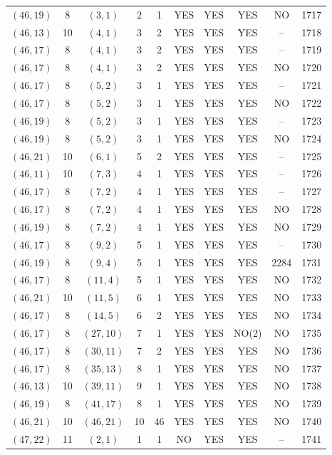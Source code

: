 \begin{longtable}{|c|c|c|c|c|c|c|c|c|c|}
$(46, 19)$ & 8 & $(3, 1)$ & 2 & 1 & YES & YES & YES & NO & 1717\\
$(46, 13)$ & 10 & $(4, 1)$ & 3 & 2 & YES & YES & YES & -- & 1718\\
$(46, 17)$ & 8 & $(4, 1)$ & 3 & 2 & YES & YES & YES & -- & 1719\\
$(46, 17)$ & 8 & $(4, 1)$ & 3 & 2 & YES & YES & YES & NO & 1720\\
$(46, 17)$ & 8 & $(5, 2)$ & 3 & 1 & YES & YES & YES & -- & 1721\\
$(46, 17)$ & 8 & $(5, 2)$ & 3 & 1 & YES & YES & YES & NO & 1722\\
$(46, 19)$ & 8 & $(5, 2)$ & 3 & 1 & YES & YES & YES & -- & 1723\\
$(46, 19)$ & 8 & $(5, 2)$ & 3 & 1 & YES & YES & YES & NO & 1724\\
$(46, 21)$ & 10 & $(6, 1)$ & 5 & 2 & YES & YES & YES & -- & 1725\\
$(46, 11)$ & 10 & $(7, 3)$ & 4 & 1 & YES & YES & YES & -- & 1726\\
$(46, 17)$ & 8 & $(7, 2)$ & 4 & 1 & YES & YES & YES & -- & 1727\\
$(46, 17)$ & 8 & $(7, 2)$ & 4 & 1 & YES & YES & YES & NO & 1728\\
$(46, 19)$ & 8 & $(7, 2)$ & 4 & 1 & YES & YES & YES & NO & 1729\\
$(46, 17)$ & 8 & $(9, 2)$ & 5 & 1 & YES & YES & YES & -- & 1730\\
$(46, 19)$ & 8 & $(9, 4)$ & 5 & 1 & YES & YES & YES & 2284 & 1731\\
$(46, 17)$ & 8 & $(11, 4)$ & 5 & 1 & YES & YES & YES & NO & 1732\\
$(46, 21)$ & 10 & $(11, 5)$ & 6 & 1 & YES & YES & YES & NO & 1733\\
$(46, 17)$ & 8 & $(14, 5)$ & 6 & 2 & YES & YES & YES & NO & 1734\\
$(46, 17)$ & 8 & $(27, 10)$ & 7 & 1 & YES & YES & NO(2) & NO & 1735\\
$(46, 17)$ & 8 & $(30, 11)$ & 7 & 2 & YES & YES & YES & NO & 1736\\
$(46, 17)$ & 8 & $(35, 13)$ & 8 & 1 & YES & YES & YES & NO & 1737\\
$(46, 13)$ & 10 & $(39, 11)$ & 9 & 1 & YES & YES & YES & NO & 1738\\
$(46, 19)$ & 8 & $(41, 17)$ & 8 & 1 & YES & YES & YES & NO & 1739\\
$(46, 21)$ & 10 & $(46, 21)$ & 10 & 46 & YES & YES & YES & NO & 1740\\
$(47, 22)$ & 11 & $(2, 1)$ & 1 & 1 & NO & YES & YES & -- & 1741\\

\end{longtable}

